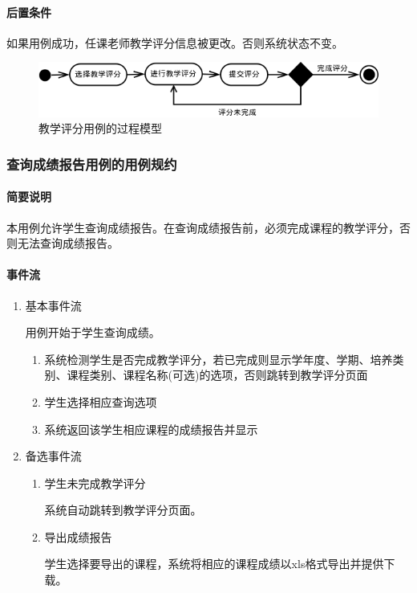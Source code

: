 \paragraph{后置条件}
  
如果用例成功，任课老师教学评分信息被更改。否则系统状态不变。

\begin{figure}[H]
  \centering
  \includegraphics[scale=0.7]{img/jwxt_accessment.png}
  \caption{教学评分用例的过程模型}
\end{figure}

\subsubsection{查询成绩报告用例的用例规约}

\paragraph{简要说明}
  
本用例允许学生查询成绩报告。在查询成绩报告前，必须完成课程的教学评分，否则无法查询成绩报告。
  
\paragraph{事件流}
  
  \begin{enumerate}
    \item 基本事件流
    
    用例开始于学生查询成绩。
    \begin{enumerate}[(1)]
      \item 系统检测学生是否完成教学评分，若已完成则显示学年度、学期、培养类别、课程类别、课程名称(可选)的选项，否则跳转到教学评分页面
      \item 学生选择相应查询选项
      \item 系统返回该学生相应课程的成绩报告并显示
    \end{enumerate}
    
    \item 备选事件流
    \begin{enumerate}[(1)]
      \item 学生未完成教学评分
      
      系统自动跳转到教学评分页面。
      
      \item 导出成绩报告
      
      学生选择要导出的课程，系统将相应的课程成绩以xls格式导出并提供下载。
      
    \end{enumerate}
  \end{enumerate}
  

